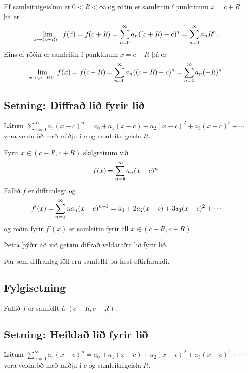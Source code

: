 \documentclass[b5paper,10pt,icelandic]{sphinxmanual}
\begin{document}
Ef samleitnigeislinn er \(0<R<\infty\) og röðin er samleitin í
punktinum \(x=c+R\) þá er
\begin{gather}
\begin{split}\lim_{x\rightarrow (c+R)^-}f(x)=f(c+R)=\sum_{n=0}^\infty
a_n((c+R)-c)^n=\sum_{n=0}^\infty a_nR^n.\end{split}\notag
\end{gather}
Eins ef röðin er samleitin í punktinum \(x=c-R\) þá er
\begin{gather}
\begin{split}\lim_{x\rightarrow (c-R)^+}f(x)=f(c-R)=\sum_{n=0}^\infty
a_n((c-R)-c)^n=\sum_{n=0}^\infty a_n(-R)^n.\end{split}\notag
\end{gather}

\subsection{Setning: Diffrað lið fyrir lið}
\label{kafli10:setning-diffra-li-fyrir-li}
Látum \(\sum_{n=0}^\infty a_n(x-c)^n=a_0+a_1(x-c)+a_2(x-c)^2+a_3(x-c)^3+\cdots\)
vera veldaröð með miðju í \(c\) og samleitnigeisla \(R\).

Fyrir \(x\in(c-R, c+R)\) skilgreinum við
\begin{gather}
\begin{split}f(x)=\sum_{n=0}^\infty a_n(x-c)^n.\end{split}\notag
\end{gather}
Fallið \(f\) er diffranlegt og
\begin{gather}
\begin{split}f'(x)=\sum_{n=1}^\infty na_n(x-c)^{n-1}=a_1+2a_2(x-c)+3a_3(x-c)^2+\cdots\end{split}\notag
\end{gather}
og röðin fyrir \(f'(x)\) er samleitin fyrir öll
\(x\in(c-R, c+R)\).

Þetta þýðir að við getum diffrað veldaraðir lið fyrir lið.

Þar sem diffranleg föll eru samfelld þá fæst eftirfarandi.


\subsection{Fylgisetning}
\label{kafli10:fylgisetning}
Fallið \(f\) er samfellt á \((c-R, c+R)\).


\subsection{Setning: Heildað lið fyrir lið}
\label{kafli10:setning-heilda-li-fyrir-li}
Látum
\(\sum_{n=0}^\infty a_n(x-c)^n=a_0+a_1(x-c)+a_2(x-c)^2+a_3(x-c)^3+\cdots\)
vera veldaröð með miðju í \(c\) og samleitnigeisla \(R\).
\end{document}
